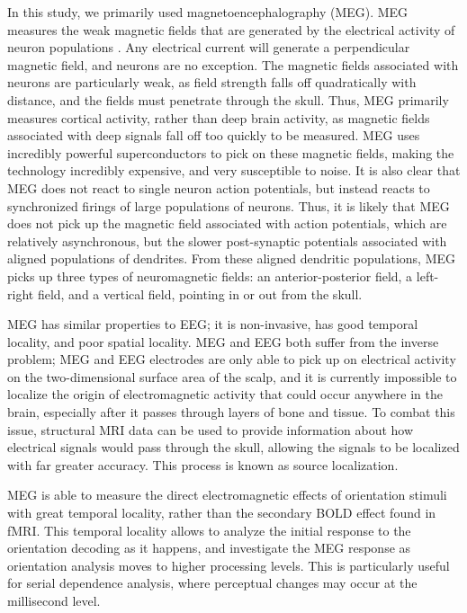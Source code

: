 \documentclass[../main.tex]{subfiles}
\begin{document}
In this study, we primarily used magnetoencephalography (MEG). MEG measures the weak magnetic fields that are generated by the electrical activity of neuron populations \citep{senior_russell_gazzaniga_2006}. Any electrical current will generate a perpendicular magnetic field, and neurons are no exception. The magnetic fields associated with neurons are particularly weak, as field strength falls off quadratically with distance, and the fields must penetrate through the skull. Thus, MEG primarily measures cortical activity, rather than deep brain activity, as magnetic fields associated with deep signals fall off too quickly to be measured. MEG uses incredibly powerful superconductors to pick on these magnetic fields, making the technology incredibly expensive, and very susceptible to noise. It is also clear that MEG does not react to single neuron action potentials, but instead reacts to synchronized firings of large populations of neurons. Thus, it is likely that MEG does not pick up the magnetic field associated with action potentials, which are relatively asynchronous, but the slower post-synaptic potentials associated with aligned populations of dendrites. From these aligned dendritic populations, MEG picks up three types of neuromagnetic fields: an anterior-posterior field, a left-right field, and a vertical field, pointing in or out from the skull.

MEG has similar properties to EEG; it is non-invasive, has good temporal locality, and poor spatial locality. MEG and EEG both suffer from the inverse problem; MEG and EEG electrodes are only able to pick up on electrical activity on the two-dimensional surface area of the scalp, and it is currently impossible to localize the origin of electromagnetic activity that could occur anywhere in the brain, especially after it passes through layers of bone and tissue. To combat this issue, structural MRI data can be used to provide information about how electrical signals would pass through the skull, allowing the signals to be localized with far greater accuracy. This process is known as source localization.

MEG is able to measure the direct electromagnetic effects of orientation stimuli with great temporal locality, rather than the secondary BOLD effect found in fMRI. This temporal locality allows to analyze the initial response to the orientation decoding as it happens, and investigate the MEG response as orientation analysis moves to higher processing levels. This is particularly useful for serial dependence analysis, where perceptual changes may occur at the millisecond level. 
\end{document}
